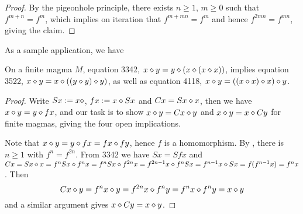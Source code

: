 \begin{proof} \leanok By the pigeonhole principle, there exists $n \geq 1$, $m \geq 0$ such that $f^{m+n} = f^m$, which implies on iteration that $f^{m+mn} = f^m$ and hence $f^{2mn} = f^{mn}$, giving the claim.
\end{proof}

As a sample application, we have

\begin{corollary}[3342]\label{3342}  On a finite magma $M$, equation 3342, $x \diamond y= y \diamond (x \diamond (x \diamond x))$, implies
  \leanok
equation 3522, $x \diamond y = x \diamond ((y \diamond y) \diamond y)$, as well as equation 4118, $x \diamond y = ((x \diamond x) \diamond x) \diamond y$.
\end{corollary}

\begin{proof} \leanok Write $Sx := x \diamond$, $fx := x \diamond Sx$ and $Cx = Sx \diamond x$, then we have $x \diamond y= y \diamond fx$, and our task is to show $x \diamond y = Cx \diamond y$ and $x \diamond y = x \diamond Cy$ for finite magmas, giving the four open implications.

Note that $x \diamond y= y \diamond fx = fx \diamond fy$, hence $f$ is a homomorphism.  By , there is $n \geq 1$ with $f^n = f^{2n}$.  From 3342 we have $Sx = S fx$ and $Cx = Sx \diamond x = f^n Sx \diamond f^n x = f^n Sx \diamond f^{2n} x = f^{2n-1} x \diamond f^n Sx = f^{n-1} x \diamond S x = f(f^{n-1} x) = f^n x$.  Then
$$ Cx \diamond y = f^n x \diamond y = f^{2n} x \diamond f^n y = f^n x \diamond f^n y = x \diamond y$$
and a similar argument gives $x \diamond Cy = x \diamond y$.
\end{proof}
